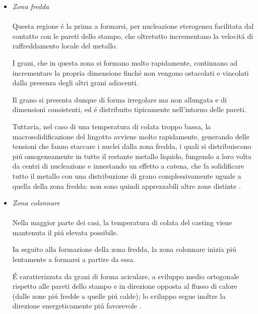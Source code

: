 \documentclass{article}
\begin{document}
                \begin{itemize}
                    \item \textit{Zona fredda} \\ \\ 
                        Questa regione é la prima a formarsi, per nucleazione
                        eterogenea facilitata dal contatto con le pareti dello stampo, che oltretutto incrementano
                        la velocitá di raffreddamento locale del metallo.

                        I grani, che in questa zona si formano molto rapidamente, continuano ad incrementare
                        la propria dimensione finché non vengono ostacolati e vincolati dalla presenza degli altri grani adiacenti. 

                        Il grano si presenta dunque di forma irregolare ma non allungata e di dimensioni
                        consistenti, ed é distribuito tipicamente nell'intorno
                        delle pareti.

                        Tuttavia, nel caso di una temperatura di colata troppo bassa, la macrosolidificazione del 
                        lingotto avviene molto rapidamente, generando delle tensioni che fanno staccare i nuclei dalla 
                        zona fredda, i quali si distribuiscono piú omogeneamente in tutto il restante metallo liquido, 
                        fungendo a loro volta da centri di nucleazione e innestando un effetto a catena, che fa solidificare
                        tutto il metallo con una distribuzione di grano complessivamente uguale a quella della zona fredda: non
                        sono quindi apprezzabili altre zone distinte \autocite{Mouritz}.
                    \item \textit{Zona colonnare} \\ \\ 
                        Nella maggior parte dei casi, la temperatura di colata del casting viene mantenuta il piú elevata
                        possibile.

                        In seguito alla formazione della zona fredda, la zona colonnare inizia piú lentamente a formarsi a partire da essa.

                        É caratterizzata da grani di forma aciculare, a sviluppo medio ortogonale rispetto alle pareti dello
                        stampo e in direzione opposta al flusso di calore (dalle zone piú fredde a quelle piú calde);
                        lo sviluppo segue inoltre la direzione energeticamente piú favorevole \autocite{Mouritz}.


\end{itemize}
\end{document}
